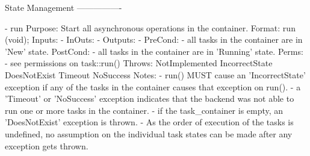 \begin{myspec}
 
    State Management
    ----------------
 
    - run
      Purpose:  Start all asynchronous operations in the
                container.
      Format:   run (void);
      Inputs:   -
      InOuts:   -
      Outputs:  -
      PreCond:  - all tasks in the container are in 'New' state.
      PostCond: - all tasks in the container are in 'Running'
                  state.
      Perms:    - see permissions on task::run()
      Throws:   NotImplemented
                IncorrectState
                DoesNotExist
                Timeout
                NoSuccess
      Notes:    - run() MUST cause an 'IncorrectState' exception 
                  if any of the tasks in the container causes 
                  that exception on run().
                - a 'Timeout' or 'NoSuccess' exception indicates
                  that the backend was not able to run one or
                  more tasks in the container.
                - if the task_container is empty, an
                  'DoesNotExist' exception is thrown.
                - As the order of execution of the tasks is
                  undefined, no assumption on the individual
                  task states can be made after any
                  exception gets thrown.
 

\end{myspec}
